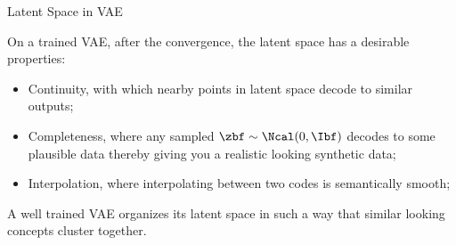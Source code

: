 \documentclass[aspectratio=169,xcolor=dvipsnames,svgnames,x11names,fleqn]{beamer}
\begin{document}
\begin{frame}{Latent Space in VAE}

On a trained VAE, after the convergence, the latent space has a desirable properties:

\begin{itemize}
\item Continuity, with which nearby points in latent space decode to similar outputs;
\item Completeness, where any sampled $\zbf \sim \Ncal(0, \Ibf)$ decodes to some plausible data thereby giving you a realistic looking synthetic data;
\item Interpolation, where interpolating between two codes is semantically smooth;
\end{itemize}

    \begin{tcolorbox}[colback=white, colframe=MainBlue!10, title=~, fonttitle=\bfseries, coltitle=MainBlue]
    
    A well trained VAE organizes its latent space in such a way that similar looking concepts cluster together.
    
    \end{tcolorbox}

\end{frame}
\end{document}
